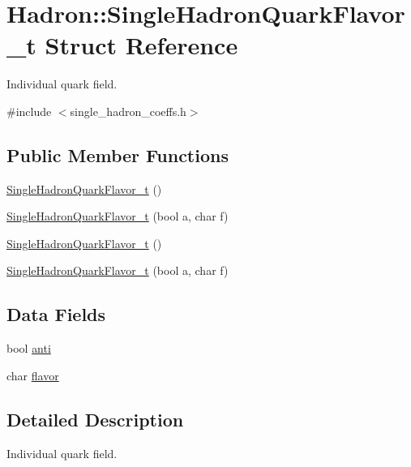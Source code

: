 \hypertarget{structHadron_1_1SingleHadronQuarkFlavor__t}{}\section{Hadron\+:\+:Single\+Hadron\+Quark\+Flavor\+\_\+t Struct Reference}
\label{structHadron_1_1SingleHadronQuarkFlavor__t}


Individual quark field.  




{\ttfamily \#include $<$single\+\_\+hadron\+\_\+coeffs.\+h$>$}

\subsection*{Public Member Functions}
\begin{DoxyCompactItemize}
\item 
\mbox{\hyperlink{structHadron_1_1SingleHadronQuarkFlavor__t_aa17c3ca156d9ab634b766a1e4e18b8a1}{Single\+Hadron\+Quark\+Flavor\+\_\+t}} ()
\item 
\mbox{\hyperlink{structHadron_1_1SingleHadronQuarkFlavor__t_a89bedb0d035a5df4cdcfd4657cd7ffe2}{Single\+Hadron\+Quark\+Flavor\+\_\+t}} (bool a, char f)
\item 
\mbox{\hyperlink{structHadron_1_1SingleHadronQuarkFlavor__t_aa17c3ca156d9ab634b766a1e4e18b8a1}{Single\+Hadron\+Quark\+Flavor\+\_\+t}} ()
\item 
\mbox{\hyperlink{structHadron_1_1SingleHadronQuarkFlavor__t_a89bedb0d035a5df4cdcfd4657cd7ffe2}{Single\+Hadron\+Quark\+Flavor\+\_\+t}} (bool a, char f)
\end{DoxyCompactItemize}
\subsection*{Data Fields}
\begin{DoxyCompactItemize}
\item 
bool \mbox{\hyperlink{structHadron_1_1SingleHadronQuarkFlavor__t_a53359c8f3cd7263a4cfa843fb03c83ee}{anti}}
\item 
char \mbox{\hyperlink{structHadron_1_1SingleHadronQuarkFlavor__t_a1a2a95305c9eb98e74a72c281a4cd36c}{flavor}}
\end{DoxyCompactItemize}


\subsection{Detailed Description}
Individual quark field. 

